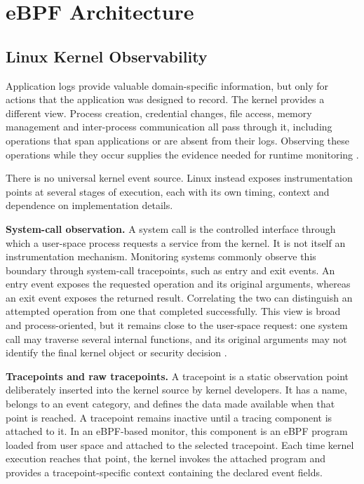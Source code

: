 \chapter{eBPF Architecture}
\label{ch:ebpf-architecture}

\section{Linux Kernel Observability}
\label{sec:linux-kernel-observability}

Application logs provide valuable domain-specific information, but only for
actions that the application was designed to record. The kernel provides a
different view. Process creation, credential changes, file access, memory
management and inter-process communication all pass through it, including
operations that span applications or are absent from their logs. Observing
these operations while they occur supplies the evidence needed for runtime
monitoring
\cite{linux_tracing_index,gbadamosi2024ebpf}.

There is no universal kernel event source. Linux instead exposes instrumentation
points at several stages of execution, each with its own timing, context and
dependence on implementation details.

\medskip
\noindent\textbf{System-call observation.}
A system call is the controlled interface through which a user-space process
requests a service from the kernel. It is not itself an instrumentation
mechanism. Monitoring systems commonly observe this boundary through
system-call tracepoints, such as entry and exit events. An entry event exposes
the requested operation and its original arguments, whereas an exit event
exposes the returned result. Correlating the two can distinguish an attempted
operation from one that completed successfully. This view is broad and
process-oriented, but it remains close to the user-space request: one system
call may traverse several internal functions, and its original arguments may
not identify the final kernel object or security decision
\cite{linux_tracepoints,linux_tracing_index}.

\medskip
\noindent\textbf{Tracepoints and raw tracepoints.}
A tracepoint is a static observation point deliberately inserted into the
kernel source by kernel developers. It has a name, belongs to an event
category, and defines the data made available when that point is reached. A
tracepoint remains inactive until a tracing component is attached to it. In an
eBPF-based monitor, this component is an eBPF program loaded from user space
and attached to the selected tracepoint. Each time kernel execution reaches
that point, the kernel invokes the attached program and provides a
tracepoint-specific context containing the declared event fields.

